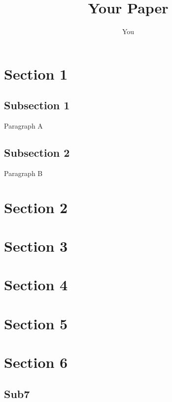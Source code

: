 \documentclass{article}
\title{Your Paper}
\author{You}
\begin{document}
\maketitle

\tableofcontents
\clearpage

\section{Section 1}

\subsection{Subsection 1}
Paragraph A

\subsection{Subsection 2}
Paragraph B

\section{Section 2}

\section{Section 3}

\section{Section 4}

\section{Section 5}

\section{Section 6}
\subsection{Sub7}
\end{document}
